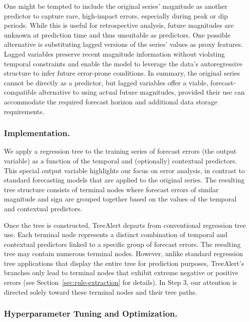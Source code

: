 \documentclass[preprint,12pt]{elsarticle}
\begin{document}
One might be tempted to include the original series’ magnitude as another predictor to capture rare, high-impact errors, especially during peak or dip periods. While this is useful for retrospective analysis, future magnitudes are unknown at prediction time and thus unsuitable as predictors. One possible alternative is substituting lagged versions of the series’ values as proxy features. Lagged variables preserve recent magnitude information without violating temporal constraints and enable the model to leverage the data’s autoregressive structure to infer future error-prone conditions. In summary, the original series cannot be directly as a predictor, but lagged variables offer a viable, forecast-compatible alternative to using actual future magnitudes, provided their use can accommodate the required forecast horizon and additional data storage requirements.

\subsubsection{Implementation.}
We apply a regression tree to the training series of forecast errors (the output variable) as a function of the temporal and (optionally) contextual predictors. This special output variable highlights our focus on error analysis, in contrast to standard forecasting models that are applied to the original series. The resulting tree structure consists of terminal nodes where forecast errors of similar magnitude and sign are grouped together based on the values of the temporal and contextual predictors. 

Once the tree is constructed, TreeAlert departs from conventional regression tree use. Each terminal node represents a distinct combination of temporal and contextual predictors linked to a specific group of forecast errors. The resulting tree may contain numerous terminal nodes. However, unlike standard regression tree applications that display the entire tree for prediction purposes, TreeAlert’s branches only lead to terminal nodes that exhibit extreme negative or positive errors (see Section~\ref{sec:rule-extraction} for details). In Step 3, our attention is directed solely toward these terminal nodes and their tree paths.

\subsubsection{Hyperparameter Tuning and Optimization.}
\label{sec:tuning_optimization}
\end{document}
